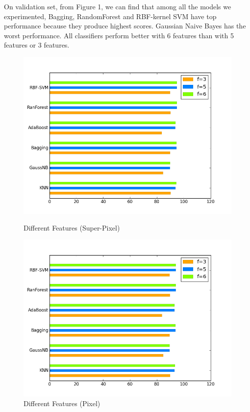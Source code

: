 \documentclass{article} %
\begin{document}
On validation set, from Figure 1, we can find that among all the models we experimented, Bagging, RandomForest and RBF-kernel SVM have top performance because they produce highest scores. Gaussian Naive Bayes has the worst performance. All classifiers perform better with 6 features than with 5 features or 3 features.\\
\begin{figure}[htbp]
\centering
\begin{minipage}{2.65in}
\centering
\includegraphics[width=1.1\textwidth]{1.png}
\caption{Different Features  (Super-Pixel)}
\end{minipage}
\begin{minipage}{2.65in}
\centering
\includegraphics[width=1.1\textwidth]{2.png}
\caption{Different Features (Pixel)}
\end{minipage}
\end{figure}
\end{document}

